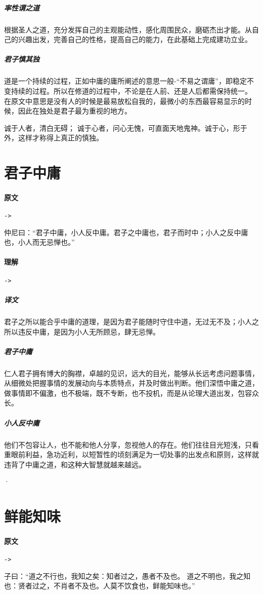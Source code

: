 \documentclass[UTF8,a4paper,8pt]{ctexbook}
\begin{document}
			\subparagraph{率性谓之道} 根据圣人之道，充分发挥自己的主观能动性，感化周围民众，磨砺杰出才能。从自己的兴趣出发，完善自己的性格，提高自己的能力，在此基础上完成建功立业。
			
			\subparagraph{君子慎其独} 道是一个持续的过程，正如中庸的庸所阐述的意思一般-“不易之谓庸”，即稳定不变持续的过程。所以在修道的过程中，不论是在人前、还是人后都需保持统一。 在原文中意思是没有人的时候是最易放松自我的，最微小的东西最容易显示的时候，因此在独处是君子最为重视的地方。
			
			诚于人者，清白无碍； 诚于心者，问心无愧，可直面天地鬼神。诚于心，形于外，这样才称得上真正的慎独。
	
	\section{君子中庸}
			\paragraph{原文}\verb|->|
				
				仲尼曰：“君子中庸，小人反中庸。君子之中庸也，君子而时中；小人之反中庸也，小人而无忌惮也。”
				
			\paragraph{理解}\verb|->|
				\subparagraph{译文}君子之所以能合乎中庸的道理，是因为君子能随时守住中道，无过无不及；小人之所以违反中庸，是因为小人无所顾忌，肆无忌惮。

				\subparagraph{君子中庸}仁人君子拥有博大的胸襟，卓越的见识，远大的目光，能够从长远考虑问题事情，从细微处把握事情的发展动向与本质特点，并及时做出判断。他们深悟中庸之道，做事情即不偏激，也不极端，既不专断，也不投机，而是从论理大道出发，包容众长。
				
				\subparagraph{小人反中庸}他们不包容让人，也不能和他人分享，忽视他人的存在。他们往往目光短浅，只看重眼前利益，急功近利，以短暂性的顷刻满足为一切处事的出发点和原则，这样就违背了中庸之道，和这种大智慧就越来越远。
				
·		\section{鲜能知味}
			\paragraph{原文}\verb|->|
				
				子曰：“道之不行也，我知之矣：知者过之，愚者不及也。 道之不明也，我之知也：贤者过之，不肖者不及也。人莫不饮食也，鲜能知味也。”
				
\end{document}
